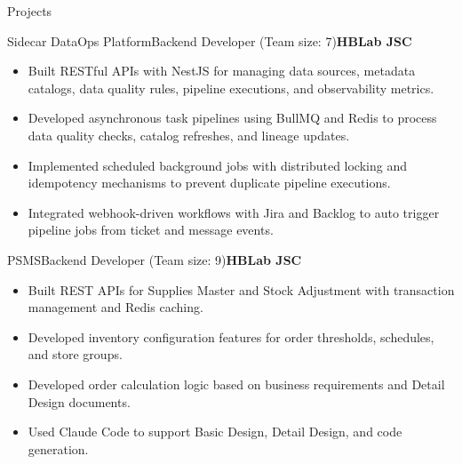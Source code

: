 \documentclass[]{style}
\newcommand{\bolddate}[1]{\textbf{#1}}
\begin{document}
\begin{section}{Projects}


\vspace{1em}
\begin{projectsubsection}{Sidecar DataOps Platform}{Backend Developer (Team size: 7)}{\bolddate{HBLab JSC}}{}
\begin{itemize}
  \item Built RESTful APIs with NestJS for managing data sources, metadata catalogs, data quality rules, pipeline executions, and observability metrics.
  \item Developed asynchronous task pipelines using BullMQ and Redis to process data quality checks, catalog refreshes, and lineage updates.
  \item Implemented scheduled background jobs with distributed locking and idempotency mechanisms to prevent duplicate pipeline executions.
  \item Integrated webhook-driven workflows with Jira and Backlog to auto trigger pipeline jobs from ticket and message events.
\end{itemize}
\end{projectsubsection}

\begin{projectsubsection}{PSMS}{Backend Developer (Team size: 9)}{\bolddate{HBLab JSC}}{}
\begin{itemize}[leftmargin=1.1em, itemsep=0pt, parsep=0pt]
  \item Built REST APIs for Supplies Master and Stock Adjustment with transaction management and Redis caching.
  \item Developed inventory configuration features for order thresholds, schedules, and store groups.
  \item Developed order calculation logic based on business requirements and Detail Design documents.
  \item Used Claude Code to support Basic Design, Detail Design, and code generation.
\end{itemize}
\end{projectsubsection}


\end{section}
\end{document}
